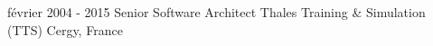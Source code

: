\item{
\cventrylc
{février 2004 - 2015} %
{Senior Software Architect} %
{Thales Training \& Simulation (TTS)} %
{Cergy, France} %
{}
{

}
} %
